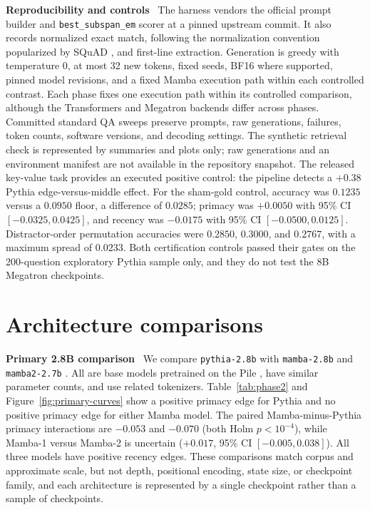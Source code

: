 \documentclass{article}
\newcommand{\runin}[1]{\par\medskip\noindent\textbf{#1}\ }
\begin{document}
\runin{Reproducibility and controls}
The harness vendors the official prompt builder and \texttt{best\_subspan\_em} scorer at a pinned upstream commit.
It also records normalized exact match, following the normalization convention popularized by SQuAD \citep{rajpurkar2016squad}, and first-line extraction.
Generation is greedy with temperature $0$, at most 32 new tokens, fixed seeds, BF16 where supported, pinned model revisions, and a fixed Mamba execution path within each controlled contrast.
Each phase fixes one execution path within its controlled comparison, although the Transformers and Megatron backends differ across phases.
Committed standard QA sweeps preserve prompts, raw generations, failures, token counts, software versions, and decoding settings.
The synthetic retrieval check is represented by summaries and plots only; raw generations and an environment manifest are not available in the repository snapshot.
The released key-value task provides an executed positive control: the pipeline detects a $+0.38$ Pythia edge-versus-middle effect.
For the sham-gold control, accuracy was $0.1235$ versus a $0.0950$ floor, a difference of $0.0285$; primacy was $+0.0050$ with 95\% CI $[-0.0325, 0.0425]$, and recency was $-0.0175$ with 95\% CI $[-0.0500, 0.0125]$.
Distractor-order permutation accuracies were $0.2850$, $0.3000$, and $0.2767$, with a maximum spread of $0.0233$.
Both certification controls passed their gates on the 200-question exploratory Pythia sample only, and they do not test the 8B Megatron checkpoints.

\section{Architecture comparisons}
\label{sec:contrast}

\runin{Primary 2.8B comparison}
We compare \texttt{pythia-2.8b} \citep{biderman2023pythia} with \texttt{mamba-2.8b} \citep{gu2023mamba} and \texttt{mamba2-2.7b} \citep{dao2024mamba2}.
All are base models pretrained on the Pile \citep{gao2020pile}, have similar parameter counts, and use related tokenizers.
Table~\ref{tab:phase2} and Figure~\ref{fig:primary-curves} show a positive primacy edge for Pythia and no positive primacy edge for either Mamba model.
The paired Mamba-minus-Pythia primacy interactions are $-0.053$ and $-0.070$ (both Holm $p<10^{-4}$), while Mamba-1 versus Mamba-2 is uncertain ($+0.017$, 95\% CI $[-0.005,0.038]$).
All three models have positive recency edges.
These comparisons match corpus and approximate scale, but not depth, positional encoding, state size, or checkpoint family, and each architecture is represented by a single checkpoint rather than a sample of checkpoints.
\end{document}
